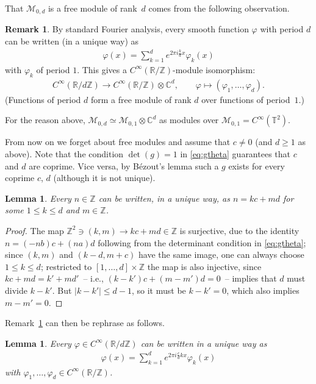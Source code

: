 \documentclass[pdftex]{sigma}
\numberwithin{equation}{section}
\newtheorem{lem}[thm]{Lemma}
\theoremstyle{definition}
\newtheorem{rem}[thm]{Remark}
\newcommand{\R}{\mathbb{R}}
\newcommand{\C}{\mathbb{C}}
\newcommand{\Z}{\mathbb{Z}}
\newcommand{\T}{\mathbb{T}}
\begin{document}
That $\mathcal{M}_{0,d}$ is a free module of rank~$d$ comes from the following observation.

\begin{rem}\label{rem:6.1}
By standard Fourier analysis, every smooth function $\varphi$ with period $d$ can be written (in a unique way) as
\begin{gather*}
\varphi(x)=\sum_{k=1}^de^{2\pi i\frac{k}{d}x}\varphi_k(x)
\end{gather*}
with $\varphi_k$ of period $1$. This gives a $C^\infty(\R/\Z)$-module isomorphism:
\begin{gather*}
C^\infty(\R/d\Z) \to C^\infty(\R/\Z)\otimes\C^d ,\qquad
\varphi\mapsto (\varphi_1,\ldots,\varphi_d) .
\end{gather*}
(Functions of period $d$ form a free module of rank $d$ over functions of period~$1$.)
\end{rem}

For the reason above, $\mathcal{M}_{0,d}\simeq \mathcal{M}_{0,1}\otimes\C^d$ as modules over $\mathcal{M}_{0,1}=C^\infty(\T^2)$.

From now on we forget about free modules and assume that $c\neq 0$ (and $d\geq 1$ as above). Note that the condition
$\det(g)=1$ in \eqref{eq:gtheta} guarantees that
$c$ and $d$ are coprime. Vice versa,
by B{\'e}zout's lemma such a $g$ exists for every coprime $c$, $d$ (although it is not unique).

\begin{lem}\label{lemma:unique}
Every $n\in\Z$ can be written, in a unique way, as $n=kc+md$ for some $1\leq k\leq d$ and $m\in\Z$.
\end{lem}

\begin{proof}
The map $\Z^2\ni (k,m)\to kc+md\in\Z$ is surjective, due to the identity
$n=(-nb)c+(na)d$ following from the determinant condition in \eqref{eq:gtheta}; since $(k,m)$
and $(k-d,m+c)$ have the same image, one can always choose $1\leq k\leq d$; restricted to
$[1,\ldots,d]\times\Z$ the map is also injective,
since $kc+md=k'+md'$~-- i.e., $(k-k')c+(m-m')d=0$~-- implies that $d$ must divide $k-k'$. But
$|k-k'|\leq d-1$, so it must be $k-k'=0$,
which also implies $m-m'=0$.
\end{proof}

Remark~\ref{rem:6.1} can then be rephrase as follows.

\begin{lem}
Every $\varphi\in C^\infty(\R/d\Z)$ can be written in a unique way as
\begin{gather*}
\varphi(x)=\sum_{k=1}^de^{2\pi i\frac{c}{d}kx}\varphi_k(x)
\end{gather*}
with $\varphi_1,\ldots,\varphi_d\in C^\infty(\R/\Z)$.
\end{lem}
\end{document}

